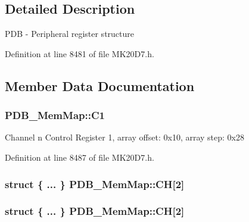 \subsection{Detailed Description}
P\+DB -\/ Peripheral register structure 

Definition at line 8481 of file M\+K20\+D7.\+h.



\subsection{Member Data Documentation}
\subsubsection[{\texorpdfstring{C1}{C1}}]{ P\+D\+B\+\_\+\+Mem\+Map\+::\+C1}\hypertarget{struct_p_d_b___mem_map_a7f3d427467fd70574b129f2ecd5a84ed}{}\label{struct_p_d_b___mem_map_a7f3d427467fd70574b129f2ecd5a84ed}
Channel n Control Register 1, array offset\+: 0x10, array step\+: 0x28 

Definition at line 8487 of file M\+K20\+D7.\+h.

\subsubsection[{\texorpdfstring{CH}{CH}}]{\setlength{\rightskip}{0pt plus 5cm}struct \{ ... \}   P\+D\+B\+\_\+\+Mem\+Map\+::\+CH\mbox{[}2\mbox{]}}\hypertarget{struct_p_d_b___mem_map_acb5aaedb136aae2c2a8fd73b39d7a5e6}{}\label{struct_p_d_b___mem_map_acb5aaedb136aae2c2a8fd73b39d7a5e6}
\subsubsection[{\texorpdfstring{CH}{CH}}]{\setlength{\rightskip}{0pt plus 5cm}struct \{ ... \}   P\+D\+B\+\_\+\+Mem\+Map\+::\+CH\mbox{[}2\mbox{]}}\hypertarget{struct_p_d_b___mem_map_a7f6b69f964f114ad3281ca7b815d1375}{}\label{struct_p_d_b___mem_map_a7f6b69f964f114ad3281ca7b815d1375}
